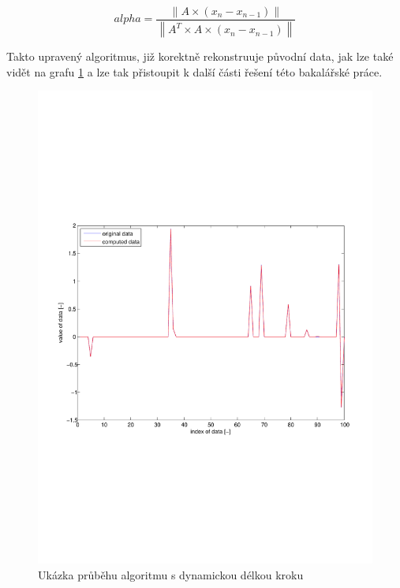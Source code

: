 \documentclass[FM,BP]{tulthesis}
\newcounter{Vzorce}
\begin{document}
\begin{equation} \label{eq:ComputeAlpha}  \tag{Vzorec \theVzorce}
alpha = \frac{\left\| A \times (x_{n} - x_{n-1}) \right\|}{\left\| A^{T} \times A \times (x_{n} - x_{n-1}) \right\| }
\end{equation}

Takto upravený algoritmus, již korektně rekonstruuje původní data, jak lze také vidět na grafu \ref{fig:dynamicAlpha} a lze tak přistoupit k další části řešení této bakalářské práce.

\begin{figure}[!ht]
\begin{center}
\includegraphics[scale=0.65]{obr/dynamic.pdf}
\end{center}
\caption{Ukázka průběhu algoritmu s dynamickou délkou kroku}
\label{fig:dynamicAlpha}
\end{figure}
\end{document}
